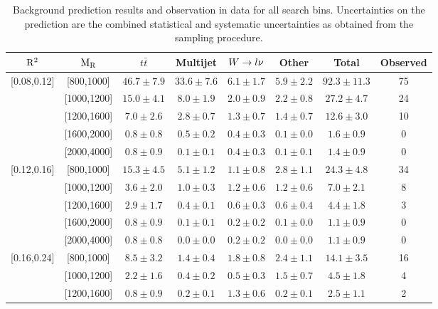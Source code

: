\begin{table}[htpb]
\centering
\caption{Background prediction results and observation in data for all search bins. Uncertainties on the prediction are the combined statistical and systematic uncertainties as obtained from the sampling procedure. \label{tab:results_prediction}}
\vspace{1ex}
\begin{tabular}{ c  c | c  c  c  c | c | c }
\hline \hline
$\mathrm{R^2}$ & $\mathrm{M_R}$& $t\bar{t}$ & Multijet & $W\rightarrow l \nu$ & Other & Total &
Observed\\ 
\hline \hline
\multirow{5}{*}{[0.08,0.12]} & [800,1000] & $46.7 \pm 7.9$ & $33.6 \pm 7.6$ & $6.1 \pm 1.7$ & $5.9 \pm 2.2$ & $92.3 \pm 11.3$ & 75 \\ 
 & [1000,1200] & $15.0 \pm 4.1$ & $8.0 \pm 1.9$ & $2.0 \pm 0.9$ & $2.2 \pm 0.8$ & $27.2 \pm 4.7$ & 24 \\ 
 & [1200,1600] & $7.0 \pm 2.6$ & $2.8 \pm 0.7$ & $1.3 \pm 0.7$ & $1.4 \pm 0.7$ & $12.6 \pm 3.0$ & 10 \\ 
 & [1600,2000] & $0.8 \pm 0.8$ & $0.5 \pm 0.2$ & $0.4 \pm 0.3$ & $0.1 \pm 0.0$ & $1.6 \pm 0.9$ & 0 \\ 
 & [2000,4000] & $0.8 \pm 0.9$ & $0.1 \pm 0.1$ & $0.4 \pm 0.3$ & $0.1 \pm 0.1$ & $1.4 \pm 0.9$ & 0 \\ 
\hline 
\multirow{5}{*}{[0.12,0.16]} & [800,1000] & $15.3 \pm 4.5$ & $5.1 \pm 1.2$ & $1.1 \pm 0.8$ & $2.8 \pm 1.1$ & $24.3 \pm 4.8$ & 34 \\ 
 & [1000,1200] & $3.6 \pm 2.0$ & $1.0 \pm 0.3$ & $1.2 \pm 0.6$ & $1.2 \pm 0.6$ & $7.0 \pm 2.1$ & 8 \\ 
 & [1200,1600] & $2.9 \pm 1.7$ & $0.4 \pm 0.1$ & $0.6 \pm 0.3$ & $0.6 \pm 0.4$ & $4.4 \pm 1.8$ & 3 \\ 
 & [1600,2000] & $0.8 \pm 0.9$ & $0.1 \pm 0.1$ & $0.2 \pm 0.2$ & $0.1 \pm 0.0$ & $1.1 \pm 0.9$ & 0 \\ 
 & [2000,4000] & $0.8 \pm 0.8$ & $0.0 \pm 0.0$ & $0.2 \pm 0.2$ & $0.0 \pm 0.0$ & $1.1 \pm 0.9$ & 0 \\ 
\hline 
\multirow{5}{*}{[0.16,0.24]} & [800,1000] & $8.5 \pm 3.2$ & $1.4 \pm 0.4$ & $1.8 \pm 0.8$ & $2.4 \pm 1.1$ & $14.1 \pm 3.5$ & 16 \\ 
 & [1000,1200] & $2.2 \pm 1.6$ & $0.4 \pm 0.2$ & $0.5 \pm 0.3$ & $1.5 \pm 0.7$ & $4.5 \pm 1.8$ & 4 \\ 
 & [1200,1600] & $0.8 \pm 0.9$ & $0.2 \pm 0.1$ & $1.3 \pm 0.6$ & $0.2 \pm 0.1$ & $2.5 \pm 1.1$ & 2 \\ 

\end{tabular}
\end{table}
